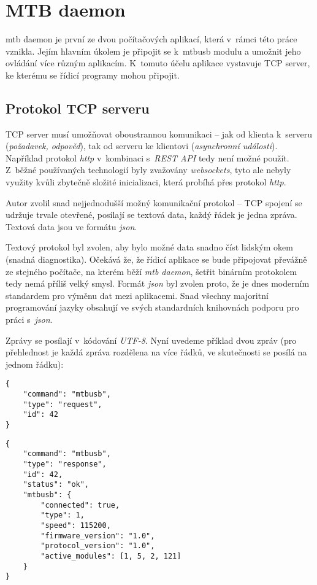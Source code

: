 \newpage
\section{MTB daemon}

\gls{mtb} daemon je první ze dvou počítačových aplikací, která v~rámci této
práce vznikla. Jejím hlavním úkolem je připojit se k~\gls{mtbusb} modulu
a umožnit jeho ovládání více různým aplikacím. K~tomuto účelu aplikace vystavuje
TCP server, ke kterému se řídicí programy mohou připojit.

\subsection{Protokol TCP serveru} \label{sec:daemon:proto}

TCP server musí umožňovat oboustrannou komunikaci – jak od klienta k~serveru
(\textit{požadavek, odpověď}), tak od serveru ke klientovi (\textit{asynchronní
události}). Například protokol \textit{http} v~kombinaci s~\textit{REST API}
tedy není možné použít. Z~běžné používaných technologií byly zvažovány
\textit{websockets}, tyto ale nebyly využity kvůli zbytečně složité inicializaci,
která probíhá přes protokol \textit{http}.

Autor zvolil snad nejjednodušší možný komunikační protokol – TCP spojení se udržuje trvale
otevřené, posílají se textová data, každý řádek je jedna zpráva. Textová data
jsou ve formátu \textit{json}.

Textový protokol byl zvolen, aby bylo možné data snadno číst lidským okem
(snadná diagnostika).  Očekává že, že řídicí aplikace se bude připojovat
převážně ze stejného počítače, na kterém běží \textit{\gls{mtb} daemon}, šetřit
 binárním protokolem tedy nemá příliš velký smysl. Formát
\textit{json} byl zvolen proto, že je dnes moderním standardem pro výměnu dat
mezi aplikacemi. Snad všechny majoritní programování jazyky obsahují ve svých
standardních knihovnách podporu pro práci s~\textit{json}.

Zprávy se posílají v~kódování \textit{UTF-8}. Nyní uvedeme příklad
dvou zpráv (pro přehlednost je každá zpráva rozdělena na více řádků, ve
skutečnosti se posílá na jednom řádku):

\begin{verbatim}
{
    "command": "mtbusb",
    "type": "request",
    "id": 42
}
\end{verbatim}

\begin{verbatim}
{
    "command": "mtbusb",
    "type": "response",
    "id": 42,
    "status": "ok",
    "mtbusb": {
        "connected": true,
        "type": 1,
        "speed": 115200,
        "firmware_version": "1.0",
        "protocol_version": "1.0",
        "active_modules": [1, 5, 2, 121]
    }
}
\end{verbatim}

